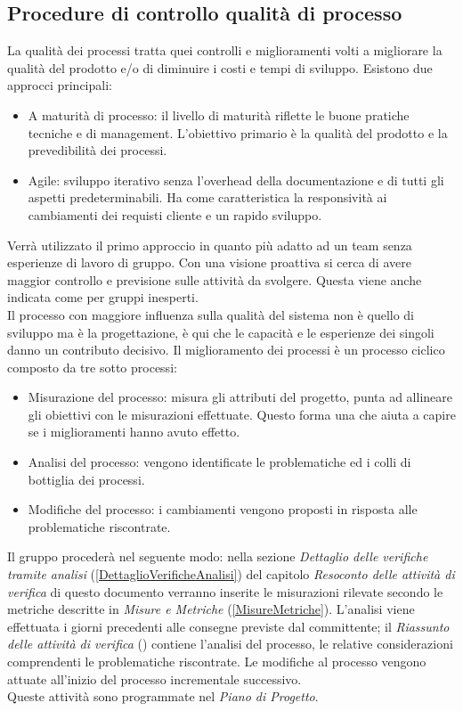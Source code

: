 	\subsection{Procedure di controllo qualità di processo} %
	La qualità dei processi tratta quei controlli e miglioramenti volti a migliorare la qualità del prodotto e/o di diminuire i costi e tempi di sviluppo. Esistono due approcci principali:
	\begin{itemize}
		\item A maturità di processo: il livello di maturità riflette le buone pratiche tecniche e di management. L'obiettivo primario è la qualità del prodotto e la prevedibilità dei processi.
		\item Agile: sviluppo iterativo senza l'overhead della documentazione e di tutti gli aspetti predeterminabili. Ha come caratteristica la responsività ai cambiamenti dei requisti cliente e un rapido sviluppo.
	\end{itemize}
	Verrà utilizzato il primo approccio in quanto più adatto ad un team senza esperienze di lavoro di gruppo. Con una visione proattiva si cerca di avere maggior controllo e previsione sulle attività da svolgere. Questa viene anche indicata come  per gruppi inesperti.\\
	Il processo con maggiore influenza sulla qualità del sistema non è quello di sviluppo ma è la progettazione, è qui che le capacità e le esperienze dei singoli danno un contributo decisivo.
	Il miglioramento dei processi è un processo ciclico composto da tre sotto processi:
	
	\begin{itemize}
		\item Misurazione del processo: misura gli attributi del progetto, punta ad allineare gli obiettivi con le misurazioni effettuate. Questo forma una  che aiuta a capire se i miglioramenti hanno avuto effetto.
		\item Analisi del processo: vengono identificate le problematiche ed i colli di bottiglia dei processi.
		\item Modifiche del processo: i cambiamenti vengono proposti in risposta alle problematiche riscontrate.
	\end{itemize}
	
	Il gruppo procederà nel seguente modo: nella sezione \emph{Dettaglio delle verifiche tramite analisi} (\ref{DettaglioVerificheAnalisi}) del capitolo \emph{Resoconto delle attività di verifica} di questo documento verranno inserite le misurazioni rilevate secondo le metriche descritte in \emph{Misure e Metriche} (\ref{MisureMetriche}). L'analisi viene effettuata i giorni precedenti alle consegne previste dal committente; il \emph{Riassunto delle attività di verifica} (\label{RiassuntoAttivitaVerifica}) contiene l'analisi del processo, le relative considerazioni  comprendenti le problematiche riscontrate.
	Le modifiche al processo vengono attuate all'inizio del processo incrementale successivo. \\
	Queste attività sono programmate nel \emph{Piano di Progetto}.
	
